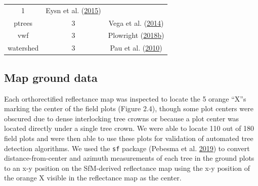 \documentclass[twoside,12pt,final]{ucthesis-CA2012}
\begin{document}
\begin{ucmainmatter}
\begin{longtable}[]{@{}ccc@{}}
\begin{minipage}[t]{0.22\columnwidth}
1\strut
\end{minipage} & \begin{minipage}[t]{0.34\columnwidth}\centering\strut
Eysn et al. (\protect\hyperlink{ref-eysn2015}{2015})\strut
\end{minipage}\tabularnewline
\begin{minipage}[t]{0.18\columnwidth}\centering\strut
ptrees\strut
\end{minipage} & \begin{minipage}[t]{0.22\columnwidth}\centering\strut
3\strut
\end{minipage} & \begin{minipage}[t]{0.34\columnwidth}\centering\strut
Vega et al. (\protect\hyperlink{ref-vega2014}{2014})\strut
\end{minipage}\tabularnewline
\begin{minipage}[t]{0.18\columnwidth}\centering\strut
vwf\strut
\end{minipage} & \begin{minipage}[t]{0.22\columnwidth}\centering\strut
3\strut
\end{minipage} & \begin{minipage}[t]{0.34\columnwidth}\centering\strut
Plowright
(\protect\hyperlink{ref-plowright2018}{2018}\protect\hyperlink{ref-plowright2018}{b})\strut
\end{minipage}\tabularnewline
\begin{minipage}[t]{0.18\columnwidth}\centering\strut
watershed\strut
\end{minipage} & \begin{minipage}[t]{0.22\columnwidth}\centering\strut
3\strut
\end{minipage} & \begin{minipage}[t]{0.34\columnwidth}\centering\strut
Pau et al. (\protect\hyperlink{ref-pau2010}{2010})\strut
\end{minipage}\tabularnewline
\bottomrule
\end{longtable}
\subsection{Map ground data}\label{map-ground-data}

Each orthorectified reflectance map was inspected to locate the 5 orange
``X''s marking the center of the field plots (Figure 2.4), though some
plot centers were obscured due to dense interlocking tree crowns or
because a plot center was located directly under a single tree crown. We
were able to locate 110 out of 180 field plots and were then able to use
these plots for validation of automated tree detection algorithms. We
used the \texttt{sf} package (Pebesma et al.
\protect\hyperlink{ref-pebesma2019}{2019}) to convert
distance-from-center and azimuth measurements of each tree in the ground
plots to an x-y position on the SfM-derived reflectance map using the
x-y position of the orange X visible in the reflectance map as the
center.


\end{ucmainmatter}
\end{document}
